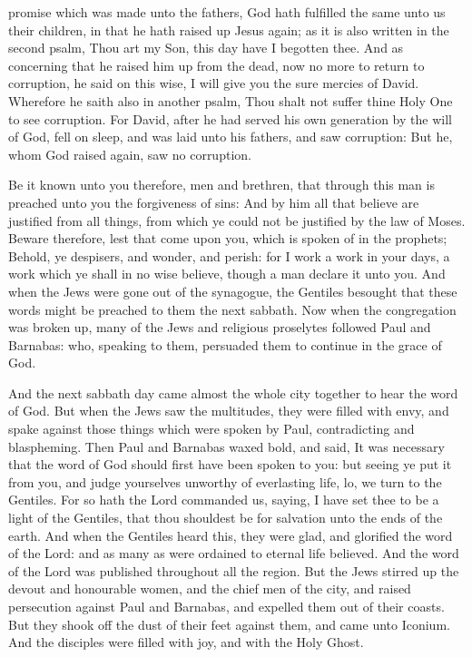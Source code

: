 promise which was made unto the fathers,  God hath
fulfilled the same unto us their children, in that he hath raised up
Jesus again; as it is also written in the second psalm, Thou art my Son,
this day have I begotten thee.  And as concerning that he
raised him up from the dead, now no more to return to corruption, he
said on this wise, I will give you the sure mercies of David.
 Wherefore he saith also in another psalm, Thou shalt not
suffer thine Holy One to see corruption.  For David,
after he had served his own generation by the will of God, fell on
sleep, and was laid unto his fathers, and saw corruption:
 But he, whom God raised again, saw no corruption.

 Be it known unto you therefore, men and brethren, that
through this man is preached unto you the forgiveness of sins:
 And by him all that believe are justified from all
things, from which ye could not be justified by the law of Moses.
 Beware therefore, lest that come upon you, which is
spoken of in the prophets;  Behold, ye despisers, and
wonder, and perish: for I work a work in your days, a work which ye
shall in no wise believe, though a man declare it unto you.
 And when the Jews were gone out of the synagogue, the
Gentiles besought that these words might be preached to them the next
sabbath.  Now when the congregation was broken up, many
of the Jews and religious proselytes followed Paul and Barnabas: who,
speaking to them, persuaded them to continue in the grace of God.

 And the next sabbath day came almost the whole city
together to hear the word of God.  But when the Jews saw
the multitudes, they were filled with envy, and spake against those
things which were spoken by Paul, contradicting and blaspheming.
 Then Paul and Barnabas waxed bold, and said, It was
necessary that the word of God should first have been spoken to you: but
seeing ye put it from you, and judge yourselves unworthy of everlasting
life, lo, we turn to the Gentiles.  For so hath the Lord
commanded us, saying, I have set thee to be a light of the Gentiles,
that thou shouldest be for salvation unto the ends of the earth.
 And when the Gentiles heard this, they were glad, and
glorified the word of the Lord: and as many as were ordained to eternal
life believed.  And the word of the Lord was published
throughout all the region.  But the Jews stirred up the
devout and honourable women, and the chief men of the city, and raised
persecution against Paul and Barnabas, and expelled them out of their
coasts.  But they shook off the dust of their feet
against them, and came unto Iconium.  And the disciples
were filled with joy, and with the Holy Ghost.

